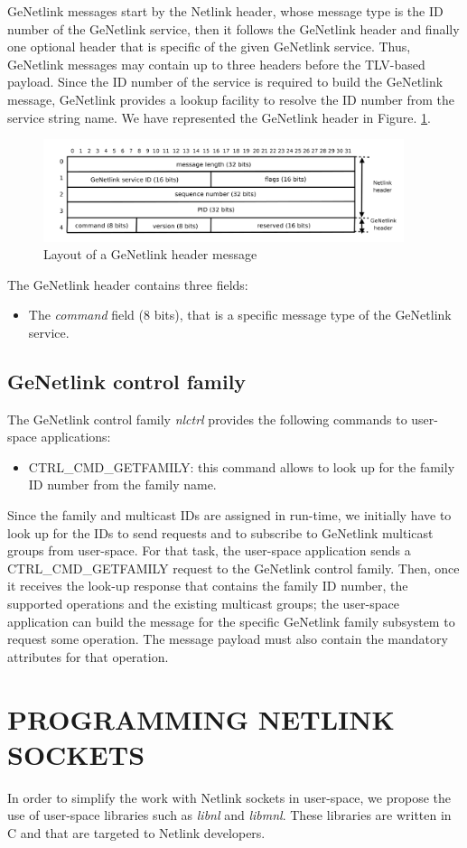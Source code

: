 \documentclass[10pt,onecolumn]{article}
\begin{document}
GeNetlink messages start by the Netlink header, whose message type is the ID number of the GeNetlink service, then it follows the GeNetlink header and finally one optional header that is specific of the given GeNetlink service. Thus, GeNetlink messages may contain up to three headers before the TLV-based payload. Since the ID number of the service is required to build the GeNetlink message, GeNetlink provides a lookup facility to resolve the ID number from the service string name. We have represented the GeNetlink header in Figure. \ref{fig:genetlink_message_header}.

\begin{figure}[h]
\begin{center}
\includegraphics[height=3cm]{figure/genetlink_message_header.png}
\end{center}
\caption{Layout of a GeNetlink header message}
\label{fig:genetlink_message_header}
\end{figure}

The GeNetlink header contains three fields:

\begin{itemize}
  \item The \textit{command} field (8 bits), that is a specific message type of the GeNetlink service.
\end{itemize}

\subsection{GeNetlink control family}

The GeNetlink control family \textit{nlctrl} provides the following commands to user-space applications:

\begin{itemize}
  \item CTRL\_CMD\_GETFAMILY: this command allows to look up for the family ID number from the family name.
\end{itemize}

Since the family and multicast IDs are assigned in run-time, we initially have to look up for the IDs to send requests and to subscribe to GeNetlink multicast groups from user-space. For that task, the user-space application sends a CTRL\_CMD\_GETFAMILY request to the GeNetlink control family. Then, once it receives the look-up response that contains the family ID number, the supported operations and the existing multicast groups; the user-space application can build the message for the specific GeNetlink family subsystem to request some operation. The message payload must also contain the mandatory attributes for that operation.

\section{PROGRAMMING NETLINK SOCKETS}

In order to simplify the work with Netlink sockets in user-space, we propose the use of user-space libraries such as \textit{libnl} and \textit{libmnl}. These libraries are written in C and that are targeted to Netlink developers.
\end{document}
